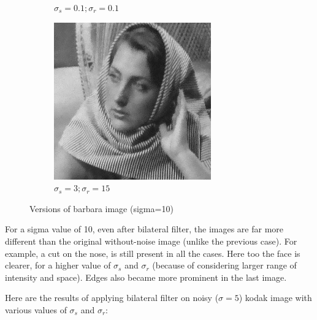 \documentclass[12pt]{article}
\begin{document}
\begin{figure}[h]
\begin{subfigure}[b]{0.24\textwidth}
        \caption{$\sigma_s=0.1;\sigma_r=0.1$}
        \label{fig:subfig3}
    \end{subfigure}
    \begin{subfigure}[b]{0.24\textwidth}
        \centering
        \includegraphics[width=\textwidth]{../images/filtered_barbara_10_sigma_s_3_sigma_r_15.png}
        \caption{$\sigma_s=3;\sigma_r=15$}
        \label{fig:subfig3}
    \end{subfigure}
    
    \caption{Versions of barbara image (sigma=10)}
    \label{fig:overall}
\end{figure}


For a sigma value of 10, even after bilateral filter, the images are far more different than the original without-noise image (unlike the previous case). For example, a cut on the nose, is still present in all the cases. Here too the face is clearer, for a higher value of $\sigma_s$ and $\sigma_r$ (because of considering larger range of intensity and space). Edges also became more prominent in the last image.


Here are the results of applying bilateral filter on noisy ($\sigma = 5$) kodak image with various values of $\sigma_s$ and $\sigma_r$:
\end{document}
